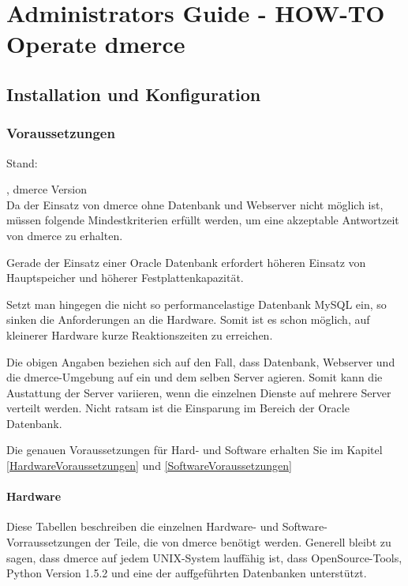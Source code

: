\part{Administrators Guide - HOW-TO Operate dmerce}

\chapter{Installation und Konfiguration}
\label{Installation}

\newpage
\section{Voraussetzungen}
\label{Voraussetzungen}


Stand: \date{\today}, dmerce Version \dmercever\\

Da der Einsatz von dmerce ohne Datenbank und Webserver nicht m\"oglich
ist, m\"ussen folgende Mindestkriterien erf\"ullt werden, um eine
akzeptable Antwortzeit von dmerce zu erhalten.

Gerade der Einsatz einer Oracle Datenbank erfordert h\"oheren Einsatz
von Hauptspeicher und h\"oherer Festplattenkapazit\"at.

Setzt man hingegen die nicht so performancelastige Datenbank MySQL
ein, so sinken die Anforderungen an die Hardware. Somit ist es schon
m\"oglich, auf kleinerer Hardware kurze Reaktionszeiten zu erreichen.

Die obigen Angaben beziehen sich auf den Fall, dass Datenbank,
Webserver und die dmerce-Umgebung auf ein und dem selben Server
agieren.  Somit kann die Austattung der Server variieren, wenn die
einzelnen Dienste auf mehrere Server verteilt werden. Nicht ratsam ist
die Einsparung im Bereich der Oracle Datenbank.

Die genauen Voraussetzungen f\"ur Hard- und Software erhalten Sie im
Kapitel \vref{HardwareVoraussetzungen} und
\vref{SoftwareVoraussetzungen}

\subsection{Hardware}
\label{HardwareVoraussetzungen}

Diese Tabellen beschreiben die einzelnen Hardware- und
Software-Vorraussetzungen der Teile, die von dmerce ben\"otigt werden.
Generell bleibt zu sagen, dass dmerce auf jedem UNIX-System
lauff\"ahig ist, dass OpenSource-Tools, Python Version 1.5.2 und eine
der auffgef\"uhrten Datenbanken unterst\"utzt.

